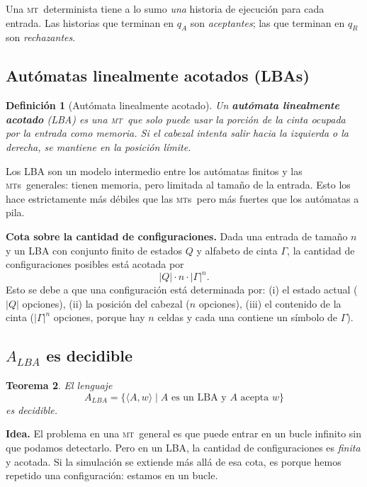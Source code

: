 \documentclass[11pt,a4paper]{article}
\theoremstyle{definicion}
\newtheorem{definicion}{Definición}[section]
\newtheorem{teorema}[definicion]{Teorema}
\newcommand{\MT}{\textsc{mt}}
\newcommand{\MTs}{\textsc{mt}s}
\newcommand{\enc}[1]{\langle #1 \rangle}
\begin{document}
Una \MT\ determinista tiene a lo sumo \emph{una} historia de ejecución para cada entrada. Las historias que terminan en $q_A$ son \emph{aceptantes}; las que terminan en $q_R$ son \emph{rechazantes}.

\subsection{Autómatas linealmente acotados (LBAs)}

\begin{definicion}[Autómata linealmente acotado]
Un \textbf{autómata linealmente acotado} (LBA) es una \MT\ que \emph{solo} puede usar la porción de la cinta ocupada por la entrada como memoria. Si el cabezal intenta salir hacia la izquierda o la derecha, se mantiene en la posición límite.
\end{definicion}

\begin{intuicion}
Los LBA son un modelo intermedio entre los autómatas finitos y las \MTs\ generales: tienen memoria, pero limitada al tamaño de la entrada. Esto los hace estrictamente más débiles que las \MTs\ pero más fuertes que los autómatas a pila.
\end{intuicion}

\textbf{Cota sobre la cantidad de configuraciones.} Dada una entrada de tamaño $n$ y un LBA con conjunto finito de estados $Q$ y alfabeto de cinta $\Gamma$, la cantidad de configuraciones posibles está acotada por
\[
|Q| \cdot n \cdot |\Gamma|^n.
\]
Esto se debe a que una configuración está determinada por: (i) el estado actual ($|Q|$ opciones), (ii) la posición del cabezal ($n$ opciones), (iii) el contenido de la cinta ($|\Gamma|^n$ opciones, porque hay $n$ celdas y cada una contiene un símbolo de $\Gamma$).

\subsection{$A_{LBA}$ es decidible}

\begin{teorema}
El lenguaje
\[
A_{LBA} = \{ \enc{A, w} \mid A \text{ es un LBA y } A \text{ acepta } w \}
\]
es decidible.
\end{teorema}

\textbf{Idea.} El problema en una \MT\ general es que puede entrar en un bucle infinito sin que podamos detectarlo. Pero en un LBA, la cantidad de configuraciones es \emph{finita} y acotada. Si la simulación se extiende más allá de esa cota, es porque hemos repetido una configuración: estamos en un bucle.
\end{document}
